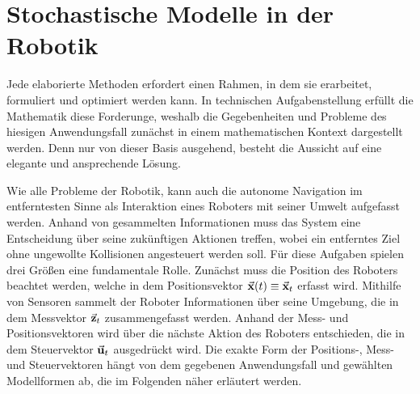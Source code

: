 \chapter{Stochastische Modelle in der Robotik}
Jede elaborierte Methoden erfordert einen Rahmen, in dem sie erarbeitet, formuliert und optimiert werden kann. In technischen Aufgabenstellung erfüllt die Mathematik diese Forderunge, weshalb die Gegebenheiten und Probleme des hiesigen Anwendungsfall zunächst in einem mathematischen Kontext dargestellt werden. Denn nur von dieser Basis ausgehend, besteht die Aussicht auf eine elegante und ansprechende Lösung.

\newpage

Wie alle Probleme der Robotik, kann auch die autonome Navigation im entferntesten Sinne als Interaktion eines Roboters mit seiner Umwelt aufgefasst werden. Anhand von gesammelten Informationen muss das System eine Entscheidung über seine zukünftigen Aktionen treffen, wobei ein entferntes Ziel ohne ungewollte Kollisionen angesteuert werden soll. Für diese Aufgaben spielen drei Größen eine fundamentale Rolle. Zunächst muss die Position des Roboters beachtet werden, welche in dem Positionsvektor $\vec{\mathbf{x}}(t) \equiv \vec{\mathbf{x}}_t$ erfasst wird. Mithilfe von Sensoren sammelt der Roboter Informationen über seine Umgebung, die in dem Messvektor $\vec{\mathbf{z}}_t$ zusammengefasst werden. Anhand der Mess- und Positionsvektoren wird über die nächste Aktion des Roboters entschieden, die in dem Steuervektor $\vec{\mathbf{u}}_t$ ausgedrückt wird. Die exakte Form der Positions-, Mess- und Steuervektoren hängt von dem gegebenen Anwendungsfall und gewählten Modellformen ab, die im Folgenden näher erläutert werden.

